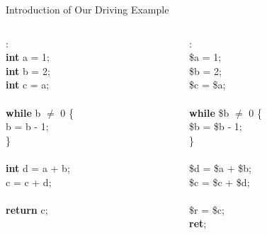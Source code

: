 \documentclass[aspectratio=169]{beamer}
\begin{document}
\begin{frame}{Introduction of Our Driving Example}
    \begin{columns}
        \begin{column}{1.5cm}
            \begin{algo}
                :\+
                \\ \textbf{int} a = 1;
                \\ \textbf{int} b = 2;
                \\ \textbf{int} c = a;
                \\
                \\ \textbf{while} b $\ne$ 0 \{\+
                \\ b = b - 1;\-
                \\ \}
                \\
                \\ \textbf{int} d = a + b;
                \\ c = c + d;
                \\
                \\ \textbf{return} c;
            \end{algo}
        \end{column}
        \pause
        \begin{column}{2cm}
            \begin{algo}
                :\+
                \\ \$a = 1;
                \\ \$b = 2;
                \\ \$c = \$a;
                \\
                \\ \textbf{while} \$b $\ne$ 0 \{\+
                \\ \$b = \$b - 1;\-
                \\ \}
                \\
                \\ \$d = \$a + \$b;
                \\ \$c = \$c + \$d;
                \\
                \\ \$r = \$c;
                \\ \textbf{ret};
            \end{algo}
        \end{column}
    \end{columns}
\end{frame}
\end{document}
